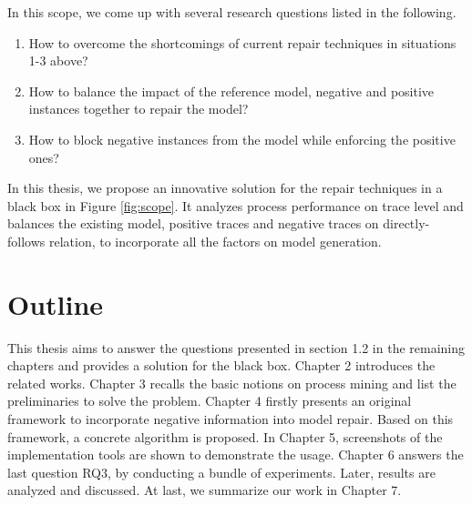 In this scope, we come up with several research questions listed in the following.
\begin{enumerate}[start=1,label={\bfseries{ RQ\arabic*:}}]
	\item How to overcome the shortcomings of current repair techniques in situations 1-3 above?
	\item How to balance the impact of the reference model, negative and positive instances together to repair the model? 
	\item How to block negative instances from the model while enforcing the positive ones?
\end{enumerate}
  
In this thesis, we propose an innovative solution for the repair techniques in a black box in Figure \ref{fig:scope}. It analyzes process performance on trace level and balances the existing model, positive traces and negative traces on directly-follows relation, to incorporate all the factors on model generation. 

\section{Outline}
This thesis aims to answer the questions presented in section 1.2 in the remaining chapters and provides a solution for the black box. 
Chapter 2 introduces the related works. Chapter 3 recalls the basic notions on process mining and list the preliminaries to solve the problem. 
Chapter 4 firstly presents an original framework to incorporate negative information into model repair. Based on this framework, a concrete algorithm is proposed. 
In Chapter 5, screenshots of the implementation tools are shown to demonstrate the usage.  Chapter 6 answers the last question RQ3, by conducting a bundle of experiments. Later, results are analyzed and discussed. 
At last, we summarize our work in Chapter 7. 



%